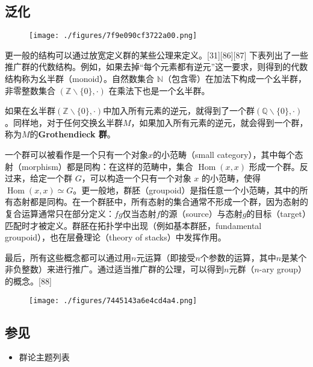 \subsection{泛化}
\begin{figure}[ht]
\centering
\texttt{[image: ./figures/7f9e090cf3722a00.png]}
\caption{} \label{fig_GroupM_14}
\end{figure}
更一般的结构可以通过放宽定义群的某些公理来定义。[31][86][87] 下表列出了一些推广群的代数结构。例如，如果去掉“每个元素都有逆元”这一要求，则得到的代数结构称为幺半群（monoid）。自然数集合 \(\mathbb{N}\)（包含零）在加法下构成一个幺半群，非零整数集合 \((\mathbb{Z} \smallsetminus \{0\}, \cdot)\) 在乘法下也是一个幺半群。  

如果在幺半群\((\mathbb{Z} \smallsetminus \{0\}, \cdot)\)中加入所有元素的逆元，就得到了一个群\((\mathbb{Q} \smallsetminus \{0\}, \cdot)\)。同样地，对于任何交换幺半群\(M\)，如果加入所有元素的逆元，就会得到一个群，称为\(M\)的\textbf{Grothendieck 群}。

一个群可以被看作是一个只有一个对象\( x \)的小范畴（small category），其中每个态射（morphism）都是同构：在这样的范畴中，集合 \(\operatorname{Hom}(x, x)\) 形成一个群。反过来，给定一个群 \( G \)，可以构造一个只有一个对象 \( x \) 的小范畴，使得 \(\operatorname{Hom}(x, x) \simeq G\)。更一般地，群胚（groupoid）是指任意一个小范畴，其中的所有态射都是同构。在一个群胚中，所有态射的集合通常不形成一个群，因为态射的复合运算通常只在部分定义：\( fg \)仅当态射\( f \)的源（source）与态射\( g \)的目标（target）匹配时才被定义。群胚在拓扑学中出现（例如基本群胚，fundamental groupoid），也在层叠理论（theory of stacks）中发挥作用。  

最后，所有这些概念都可以通过用\(n\)元运算（即接受\( n \)个参数的运算，其中\( n \)是某个非负整数）来进行推广。通过适当推广群的公理，可以得到\(n\)元群（\(n\)-ary group）的概念。[88]
\begin{figure}[ht]
\centering
\texttt{[image: ./figures/7445143a6e4cd4a4.png]}
\caption{} \label{fig_GroupM_15}
\end{figure}
\subsection{参见}
\begin{itemize}
\item 群论主题列表
\end{itemize}
